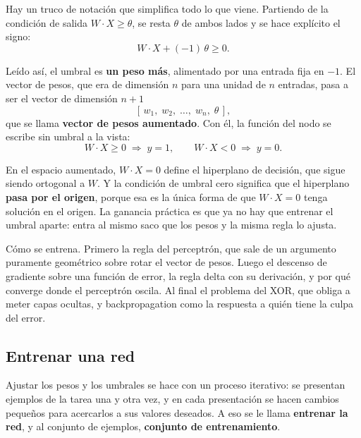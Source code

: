 \documentclass[11pt,letterpaper]{article}
\begin{document}
Hay un truco de notación que simplifica todo lo que viene. Partiendo
de la condición de salida $W \cdot X \geq \theta$, se resta $\theta$
de ambos lados y se hace explícito el signo:
\[
    W \cdot X + (-1)\,\theta \geq 0 .
\]

Leído así, el umbral es \textbf{un peso más}, alimentado por una
entrada fija en $-1$. El vector de pesos, que era de dimensión $n$
para una unidad de $n$ entradas, pasa a ser el vector de dimensión
$n+1$
\[
    [\,w_1,\; w_2,\; \ldots,\; w_n,\; \theta\,] ,
\]
que se llama \textbf{vector de pesos aumentado}. Con él, la función
del nodo se escribe sin umbral a la vista:
\[
    W \cdot X \geq 0 \;\Longrightarrow\; y = 1 ,
    \qquad
    W \cdot X < 0 \;\Longrightarrow\; y = 0 .
\]

\begin{idea}
  En el espacio aumentado, $W \cdot X = 0$ define el hiperplano de
  decisión, que sigue siendo ortogonal a $W$. Y la condición de
  umbral cero significa que el hiperplano \textbf{pasa por el
  origen}, porque esa es la única forma de que $W \cdot X = 0$ tenga
  solución en el origen. La ganancia práctica es que ya no hay que
  entrenar el umbral aparte: entra al mismo saco que los pesos y la
  misma regla lo ajusta.
\end{idea}

\newpage



\begin{quick_sum}
    Cómo se entrena. Primero la regla del perceptrón, que sale de un
    argumento puramente geométrico sobre rotar el vector de pesos.
    Luego el descenso de gradiente sobre una función de error, la
    regla delta con su derivación, y por qué converge donde el
    perceptrón oscila. Al final el problema del XOR, que obliga a
    meter capas ocultas, y backpropagation como la respuesta a quién
    tiene la culpa del error.
\end{quick_sum}

\subsection*{Entrenar una red}

Ajustar los pesos y los umbrales se hace con un proceso iterativo: se
presentan ejemplos de la tarea una y otra vez, y en cada presentación
se hacen cambios pequeños para acercarlos a sus valores deseados. A
eso se le llama \textbf{entrenar la red}, y al conjunto de ejemplos,
\textbf{conjunto de entrenamiento}.
\end{document}
